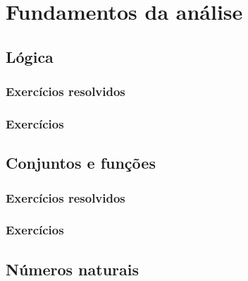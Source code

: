 
\chapter{Fundamentos da análise}\label{cap:fundamentos_da_analise}

\emconstrucao

\section{Lógica}\label{sec:logica}

\construirSec

\subsection*{Exercícios resolvidos}

\construirExeresol

\subsection*{Exercícios}

\construirExer

\section{Conjuntos e funções}\label{sec:conjuntos_e_funcoes}

\construirSec

\subsection*{Exercícios resolvidos}

\construirExeresol

\subsection*{Exercícios}

\construirExer

\section{Números naturais}\label{sec:numeros_naturais}

